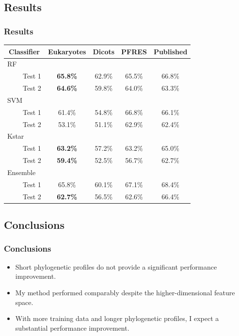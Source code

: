 \documentclass{beamer}
\begin{document}
\subsection{Results}
\begin{frame}
  \frametitle{Results}
  \begin{table} \centering
  \begin{tabular}{ c c c c c }
    \hline
    \textbf{Classifier} & \textbf{Eukaryotes} & \textbf{Dicots} & \textbf{PFRES} & \textbf{Published} \\ \hline
    \multicolumn{1}{l}{RF} & \multicolumn{4}{c}{\hspace{15px}} \\
    \multicolumn{1}{r}{Test 1} & \textbf{65.8\%} & 62.9\% & 65.5\% & 66.8\% \\
    \multicolumn{1}{r}{Test 2} & \textbf{64.6\%} & 59.8\% & 64.0\% & 63.3\% \\
    \multicolumn{1}{l}{SVM} & \multicolumn{4}{c}{\hspace{15px}} \\
    \multicolumn{1}{r}{Test 1} & 61.4\% & 54.8\% & 66.8\% & 66.1\% \\
    \multicolumn{1}{r}{Test 2} & 53.1\% & 51.1\% & 62.9\% & 62.4\% \\
    \multicolumn{1}{l}{Kstar} & \multicolumn{4}{c}{\hspace{15px}} \\
    \multicolumn{1}{r}{Test 1} & \textbf{63.2\%} & 57.2\% & 63.2\% & 65.0\% \\
    \multicolumn{1}{r}{Test 2} & \textbf{59.4\%} & 52.5\% & 56.7\% & 62.7\% \\
    \multicolumn{1}{l}{Ensemble \hspace{25px} ~} & \multicolumn{4}{c}{\hspace{15px}} \\
    \multicolumn{1}{r}{Test 1} & 65.8\% & 60.1\% & 67.1\% & 68.4\% \\
    \multicolumn{1}{r}{Test 2} & \textbf{62.7\%} & 56.5\% & 62.6\% & 66.4\% \\ \hline
  \end{tabular}
  \vspace{5px}
\end{table}
\end{frame}

\subsection{Conclusions}
\begin{frame}
  \frametitle{Conclusions}
  \begin{itemize}
    \item Short phylogenetic profiles do not provide a significant performance improvement.
    \item My method performed comparably despite the higher-dimensional feature space.
    \item With more training data and longer phylogenetic profiles, I expect a substantial performance improvement.
  \end{itemize}
\end{frame}
\end{document}
